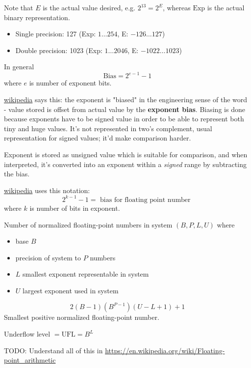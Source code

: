 \documentclass[10pt]{amsart}
\begin{document}
\begin{multicols*}{2}
Note that $E$ is the actual value desired, e.g. $2^{13} = 2^{E}$, whereas $\text{Exp}$ is the actual binary representation.

\begin{itemize}
	\item Single precision: 127 (Exp: $1\dots 254$, E: $-126 \dots 127$) 
	\item Double precision: 1023 (Exp: $1\dots 2046$, E: $-1022 \dots 1023$) 
\end{itemize}
In general
\begin{equation}
\text{Bias} = 2^{e-1} - 1
\end{equation}
where $e$ is number of exponent bits.

\href{https://en.wikipedia.org/wiki/Exponent_bias}{wikipedia} says this: the exponent is "biased" in the engineering sense of the word - value stored is offset from actual value by the \textbf{exponent bias}. Biasing is done because exponents have to be signed value in order to be able to represent both tiny and huge values. It's not represented in two's complement, usual representation for signed values; it'd make comparison harder.

Exponent is stored as unsigned value which is suitable for comparison, and when interpreted, it's converted into an exponent within a \emph{signed} range by subtracting the bias.

\href{https://en.wikipedia.org/wiki/Exponent_bias}{wikipedia} uses this notation:
\[
2^{k-1} - 1 = \text{ bias for floating point number }
\]
where $k$ is number of bits in exponent.

Number of normalized floating-point numbers in system $(B, P, L, U)$ where 
\begin{itemize}
	\item base $B$
	\item precision of system to $P$ numbers
	\item $L$ smallest exponent representable in system
	\item $U$ largest exponent used in system
\end{itemize}
\begin{equation}
2(B-1)(B^{P-1}) (U - L + 1) + 1
\end{equation}
Smallest positive normalized floating-point number.

Underflow level $= \text{UFL} = B^L$

TODO: Understand all of this in \url{https://en.wikipedia.org/wiki/Floating-point_arithmetic}


\end{multicols*}
\end{document}
